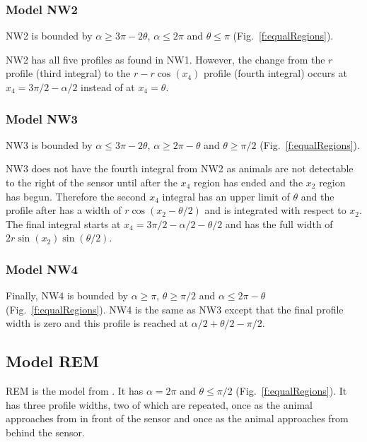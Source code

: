 \subsubsection{Model NW2} \label{NW2}

NW2 is bounded by $\alpha \ge 3\pi - 2\theta$, $\alpha \le 2\pi$ and $\theta\le\pi$ (Fig.~\ref{f:equalRegions}).

NW2 has all five profiles as found in NW1. However, the change from the $r$ profile (third integral) to the $r - r\cos(x_4)$ profile (fourth integral) occurs at $x_4 = 3\pi/2 - \alpha/2$ instead of at $x_4 = \theta$. 




\subsubsection{Model NW3} \label{NW3}

NW3 is bounded by $\alpha \le 3\pi - 2\theta$, $\alpha\ge 2\pi-\theta$ and $\theta\ge\pi/2$ (Fig.~\ref{f:equalRegions}).

NW3 does not have the fourth integral from NW2 as animals are not detectable to the right of the sensor until after the $x_4$ region has ended and the $x_2$ region has begun. Therefore the second $x_4$ integral has an upper limit of $\theta $ and the profile after has a width of $r\cos(x_2 - \theta/2)$ and is integrated with respect to $x_2$. The final integral starts at $x_4 = 3\pi/2 - \alpha/2 - \theta/2$ and has the full width of $2r\sin(x_2)\sin(\theta/2)$.



\subsubsection{Model NW4} \label{NW4}

Finally, NW4 is bounded by $\alpha\ge \pi$, $\theta\ge \pi/2$ and $\alpha \le 2\pi - \theta$ (Fig.~\ref{f:equalRegions}). NW4 is the same as NW3 except that the final profile width is zero and this profile is reached at $\alpha/2+\theta/2-\pi/2$. 




\subsection{Model REM} \label{REM}

REM is the model from \citep{rowcliffe2008estimating}. It has $\alpha =2\pi$ and $\theta \le \pi/2$ (Fig.~\ref{f:equalRegions}). It has three profile widths, two of which are repeated, once as the animal approaches from in front of the sensor and once as the animal approaches from behind the sensor.

